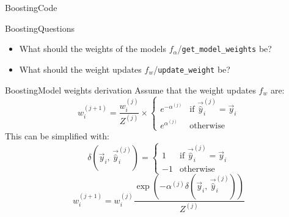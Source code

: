 \documentclass[10pt]{beamer}
\begin{document}
\begin{frame}{Boosting}{Code}
  
\end{frame}

\begin{frame}{Boosting}{Questions}
  \begin{itemize}
    \item What should the weights of the models $f_\alpha$/\lstinline[language=Python]{get_model_weights} be?
    \item What should the weight updates $f_w$/\lstinline[language=Python]{update_weight} be?
  \end{itemize}
\end{frame}

\begin{frame}{Boosting}{Model weights derivation}
  Assume that the weight updates $f_w$ are:
  \begin{equation*}
    w^{(j+1)}_i
    =
    \frac{w^{(j)}_i}{Z^{(j)}}
    \times
    \begin{cases}
      e^{-\alpha^{(j)}} & \text{if } \vec{\hat{y}}_i^{(j)} = \vec{y}_i
      \\
      e^{\alpha^{(j)}}  & \text{otherwise}
    \end{cases}
  \end{equation*}
  This can be simplified with:
  \begin{equation*}
    \delta(\vec{y}_i,\,\vec{\hat{y}}_i^{(j)})
    =
    \begin{cases}
      1  & \text{if } \vec{\hat{y}}_i^{(j)} = \vec{y}_i
      \\
      -1 & \text{otherwise}
    \end{cases}
  \end{equation*}
  \begin{equation*}
    w^{(j+1)}_i
    =
    w^{(j)}_i\frac{\exp(-\alpha^{(j)}\delta(\vec{y}_i,\,\vec{\hat{y}}_i^{(j)}))}{Z^{(j)}}
  \end{equation*}
\end{frame}
\end{document}
